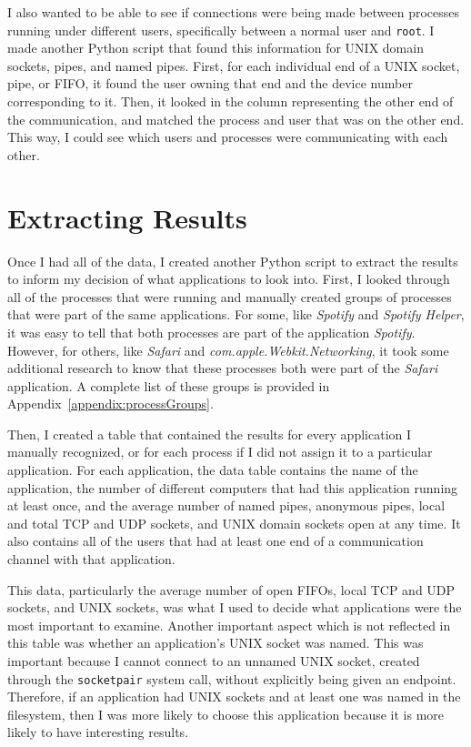 I also wanted to be able to see if connections were being made between processes running under different users, specifically between a normal user and \texttt{root}.  I made another Python script that found this information for UNIX domain sockets, pipes, and named pipes.  First, for each individual end of a UNIX socket, pipe, or FIFO, it found the user owning that end and the device number corresponding to it.  Then, it looked in the column representing the other end of the communication, and matched the process and user that was on the other end.  This way, I could see which users and processes were communicating with each other.

\section{Extracting Results}
\label{sec:extractResults}
Once I had all of the data, I created another Python script to extract the results to inform my decision of what applications to look into.  First, I  looked through all of the processes that were running and manually created groups of processes that were part of the same applications.  For some, like \textit{Spotify} and \textit{Spotify Helper}, it was easy to tell that both processes are part of the application \textit{Spotify}.  However, for others, like \textit{Safari} and \textit{com.apple.Webkit.Networking}, it took some additional research to know that these processes both were part of the \textit{Safari} application.  A complete list of these groups is provided in Appendix~\ref{appendix:processGroups}.

Then, I created a table that contained the results for every application I manually recognized, or for each process if I did not assign it to a particular application.  For each application, the data table contains the name of the application, the number of different computers that had this application running at least once, and the average number of named pipes, anonymous pipes, local and total TCP and UDP sockets, and UNIX domain sockets open at any time.  It also contains all of the users that had at least one end of a communication channel with that application.

This data, particularly the average number of open FIFOs, local TCP and UDP sockets, and UNIX sockets, was what I used to decide what applications were the most important to examine.  Another important aspect which is not reflected in this table was whether an application's UNIX socket was named.  This was important because I cannot connect to an unnamed UNIX socket, created through the \texttt{socketpair} system call, without explicitly being given an endpoint.  Therefore, if an application had UNIX sockets and at least one was named in the filesystem, then I was more likely to choose this application because it is more likely to have interesting results.

